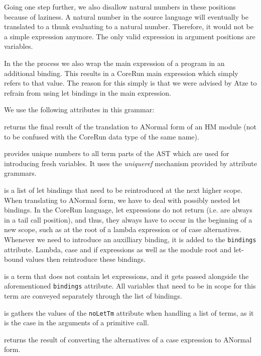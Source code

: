 \documentclass{scrartcl}
\newcommand{\attrdesc}[2]{\texttt{#1}, \emph{#2}}
\begin{document}
Going one step further, we also disallow natural numbers in these positions because of laziness. A natural number in the source language will eventually be translated to a thunk evaluating to a natural number. Therefore, it would not be a simple expression anymore.
The only valid expression in argument positions are variables.

In the the process we also wrap the main expression of a program in an additional binding. This results in a CoreRun main expression which simply refers to that value.
The reason for this simply is that we were advised by Atze to refrain from using let bindings in the main expression.

We use the following attributes in this grammar:

\begin{description}[style=multiline,leftmargin=4cm,font=\normalfont]

\item[\attrdesc{anf :: Mod}{synthesized}] returns the final result of the translation to ANormal form of an HM module (not to be confused with the CoreRun data type of the same name).

\item[\attrdesc{counter :: Int}{chained}] provides unique numbers to all term parts of the AST which are used for introducing fresh variables. It uses the \emph{uniqueref} mechanism provided by attribute grammars.

\item[\attrdesc{bindings :: Bindings}{synthesized}] is a list of let bindings that need to be reintroduced at the next higher scope. When translating to ANormal form, we have to deal with possibly nested let bindings. In the CoreRun language, let expressions do not return (i.e. are always in a tail call position), and thus, they always have to occur in the beginning of a new scope, such as at the root of a lambda expression or of case alternatives.
Whenever we need to introduce an auxilliary binding, it is added to the \texttt{bindings} attribute.
Lambda, case and if expressions as well as the module root and let-bound values then reintroduce these bindings.

\item[\attrdesc{noLetTm :: Tm}{synthesized}] is a term that does not contain let expressions, and it gets passed alongside the aforementioned \texttt{bindings} attribute.
All variables that need to be in scope for this term are conveyed separately through the list of bindings.

\item[\attrdesc{noLetTmL :: TmL}{synthesized}] is gathers the values of the \texttt{noLetTm} attribute when handling a list of terms, as it is the case in the arguments of a primitive call.

\item[\attrdesc{anfAltL :: AltL}{synthesized}] returns the result of converting the alternatives of a case expression to ANormal form.

\end{description}
\end{document}

